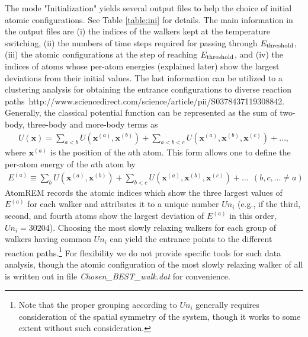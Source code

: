 \documentclass[preprint,12pt]{elsarticle}
\begin{document}
The mode "Initialization" yields several output files to help the choice of initial atomic configurations. See Table \ref{table:ini} for details. The main information in the output files are (i) the indices of the walkers kept at the temperature switching, (ii) the numbers of time steps required for passing through $E_{\rm threshold}$, (iii) the atomic configurations at the step of reaching $E_{\rm threshold}$, and (iv) the indices of atoms whose per-atom energies (explained later) show the largest deviations from their initial values. The last information can be utilized to a clustering analysis for obtaining the entrance configurations to diverse reaction paths~http://www.sciencedirect.com/science/article/pii/S0378437119308842. Generally, the classical potential function can be represented as the sum of two-body, three-body and more-body terms as
\begin{eqnarray}
U({\bm x})
=\sum_{a<b}U({\bm x}^{(a)}, {\bm x}^{(b)})+\sum_{a<b<c}U({\bm x}^{(a)}, {\bm x}^{(b)}, {\bm x}^{(c)})+\dots,
\end{eqnarray}
where ${\bm x}^{(a)}$ is the position of the $a$th atom. This form allows one to define the per-atom energy of the $a$th atom by
\begin{eqnarray}
E^{(a)}
\equiv
\sum_{b}U({\bm x}^{(a)}, {\bm x}^{(b)})+\sum_{b<c}U({\bm x}^{(a)}, {\bm x}^{(b)}, {\bm x}^{(c)})+\dots \ \  (b, c, \dots \neq a )
\end{eqnarray} 
AtomREM records the atomic indices which show the three largest values of $E^{(a)}$ for each walker and attributes it to a unique number $Un_{i}$ (e.g., if the third, second, and fourth atoms show the largest deviation of $E^{(a)}$ in this order, $Un_{i}=30204$). Choosing the most slowly relaxing walkers for each group of walkers having common $Un_{i}$ can yield the entrance points to the different reaction paths.\footnote{Note that the proper grouping according to $Un_{i}$ generally requires consideration of the spatial symmetry of the system, though it works to some extent without such consideration.} For flexibility we do not provide specific tools for such data analysis, though the atomic configuration of the most slowly relaxing walker of all is written out in file {\it Chosen\_BEST\_walk.dat} for convenience.

\end{document}
